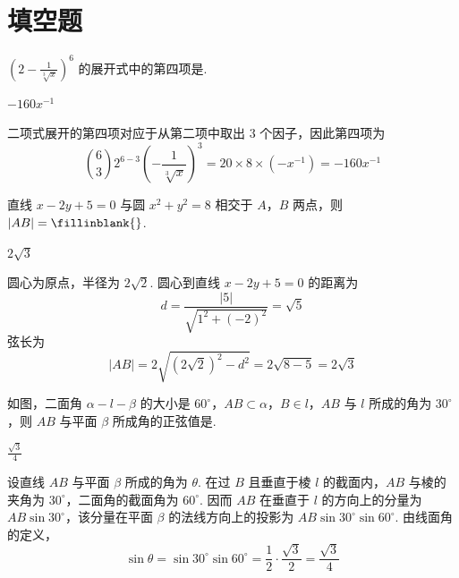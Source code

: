 \section{填空题}

\begin{problem}
\(\left(2 - \frac{1}{\sqrt[3]{x}}\right)^6\) 的展开式中的第四项是\fillinblank{}.
\end{problem}

\begin{answer}
\(-160x^{-1}\)
\end{answer}

\begin{solution}
二项式展开的第四项对应于从第二项中取出 \(3\) 个因子，因此第四项为
\[
\binom63 2^{6-3}\left(-\frac1{\sqrt[3]{x}}\right)^3
=20\times8\times(-x^{-1})=-160x^{-1}
\]
\end{solution}

\begin{problem}
直线 \(x - 2y + 5 = 0\) 与圆 \(x^{2} + y^{2} = 8\) 相交于 \(A\)，\(B\) 两点，则 \(|AB| =\fillinblank{}\).
\end{problem}

\begin{answer}
\(2\sqrt{3}\)
\end{answer}

\begin{solution}
圆心为原点，半径为 \(2\sqrt2\). 圆心到直线 \(x-2y+5=0\) 的距离为
\[
d=\frac{|5|}{\sqrt{1^2+(-2)^2}}=\sqrt5
\]
弦长为
\[
|AB|=2\sqrt{(2\sqrt2)^2-d^2}=2\sqrt{8-5}=2\sqrt3
\]
\end{solution}

\begin{problem}
如图，二面角 \(\alpha - l - \beta\) 的大小是 \(60^{\circ}\)，\(AB \subset \alpha\)，\(B \in l\)，\(AB\) 与 \(l\) 所成的角为 \(30^{\circ}\)，则 \(AB\) 与平面 \(\beta\) 所成角的正弦值是\fillinblank{}.

\end{problem}

\begin{answer}
\(\frac{\sqrt{3}}{4}\)
\end{answer}

\begin{solution}
设直线 \(AB\) 与平面 \(\beta\) 所成的角为 \(\theta\). 在过 \(B\) 且垂直于棱 \(l\) 的截面内，\(AB\) 与棱的夹角为 \(30^{\circ}\)，二面角的截面角为 \(60^{\circ}\). 因而 \(AB\) 在垂直于 \(l\) 的方向上的分量为 \(AB\sin30^{\circ}\)，该分量在平面 \(\beta\) 的法线方向上的投影为 \(AB\sin30^{\circ}\sin60^{\circ}\). 由线面角的定义，
\[
\sin\theta=\sin30^{\circ}\sin60^{\circ}=\frac12\cdot\frac{\sqrt3}{2}=\frac{\sqrt3}{4}
\]
\end{solution}

